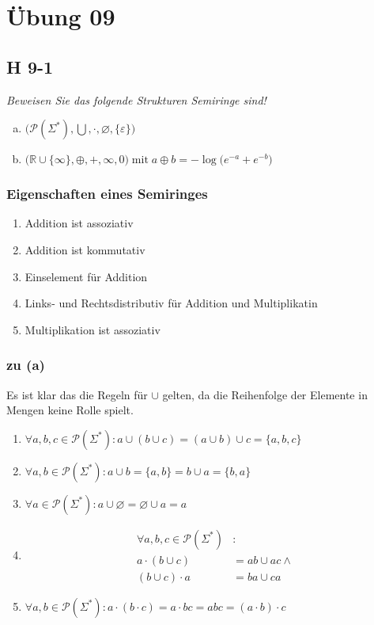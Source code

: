 \documentclass{scrartcl}
\begin{document}
\section{Übung 09}

\subsection{H 9-1}

\textsl{Beweisen Sie das folgende Strukturen \emph{Semiringe} sind!}

\begin{enumerate}[(a)]
    \item $\Big(\mathcal{P}(\Sigma^*), \bigcup, \cdot, \varnothing, \{\varepsilon\} \Big)$
    \item $\Big(\mathbb{R} \cup \{\infty\}, \oplus, +, \infty, 0 \Big) \;\text{mit}\; a \oplus b = -\log\big(e^{-a}+e^{-b}\big)$
\end{enumerate}

\subsubsection{Eigenschaften eines Semiringes}
\begin{enumerate}
    \setlength\itemsep{-1em}
    \item Addition ist assoziativ
    \item Addition ist kommutativ
    \item Einselement für Addition
    \item Links- und Rechtsdistributiv für Addition und Multiplikatin
    \item Multiplikation ist assoziativ
\end{enumerate}

\subsubsection{zu (a)}

\newcommand{\baseset}{\mathcal{P}(\Sigma^*)}
Es ist klar das die Regeln für $\cup$ gelten, da die Reihenfolge der Elemente in Mengen keine Rolle spielt.
\begin{enumerate}
    \item $\forall a, b, c \in \baseset: a \cup (b \cup c) = (a \cup b) \cup c = \{a, b, c\}$
    \item $\forall a, b \in \baseset: a \cup b = \{a, b\} = b \cup a = \{b, a\}$
    \item $\forall a \in \baseset: a \cup \varnothing = \varnothing \cup a = a$
    \item \begin{align*}
        \forall a, b, c \in \baseset&:\\
            a \cdot (b \cup c) &= ab \cup ac \land\\
            (b \cup c) \cdot a &= ba \cup ca
    \end{align*}
    \item $\forall a, b \in \baseset: a \cdot (b \cdot c) = a \cdot bc = abc = (a \cdot b) \cdot c$
\end{enumerate}
\end{document}
